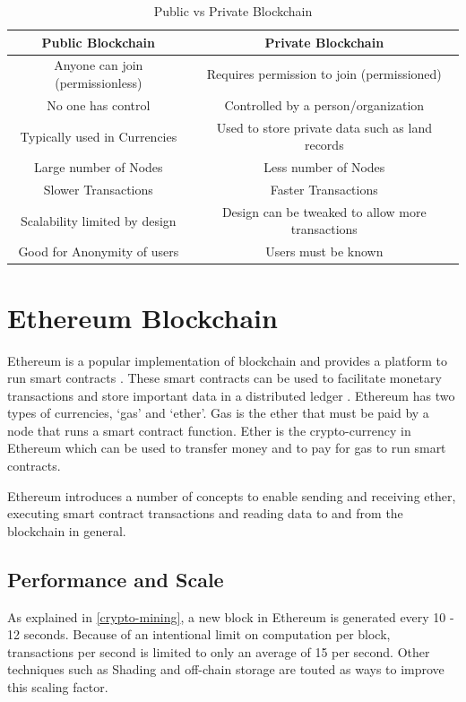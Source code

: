 \documentclass[11pt,openright]{report}
\begin{document}
\begin{table}[!htbp]
	\renewcommand{\arraystretch}{1.3}
	\caption{Public vs Private Blockchain}
	\label{pub_priv_blockchains}
	\centering
	\begin{tabular}{|c|c|}
		\hline
		\bfseries Public Blockchain & \bfseries Private Blockchain \\
		\hline\hline
		Anyone can join (permissionless) & Requires permission to join (permissioned) \\ \hline
	    No one has control & Controlled by a person/organization \\ \hline
        Typically used in Currencies & Used to store private data such as land records \\ \hline
        Large number of Nodes & Less number of Nodes \\ \hline
        Slower Transactions  & Faster Transactions \\ \hline
        Scalability limited by design  & Design can be tweaked to allow more transactions \\ \hline
        Good for Anonymity of users  & Users must be known \\ \hline
	\end{tabular}
\end{table}


\section{Ethereum Blockchain}
Ethereum is a popular implementation of blockchain and provides a platform to run smart contracts \cite{buterin2013whitepaper}. These smart contracts can be used to facilitate monetary transactions and store important data in a distributed ledger \cite{egbertsen2016replacing}. Ethereum has two types of currencies, ‘gas’ and ‘ether’. Gas is the ether that must be paid by a node that runs a smart contract function. Ether is the crypto-currency in Ethereum which can be used to transfer money and to pay for gas to run smart contracts.

Ethereum introduces a number of concepts to enable sending and receiving ether, executing smart contract transactions and reading data to and from the blockchain in general.



\subsection{Performance and Scale}
As explained in \ref{crypto-mining}, a new block in Ethereum is generated every 10 - 12 seconds. Because of an intentional limit on computation per block, transactions per second is limited to only an average of 15 per second. Other techniques such as Shading and off-chain storage are touted as ways to improve this scaling factor. 
\end{document}
